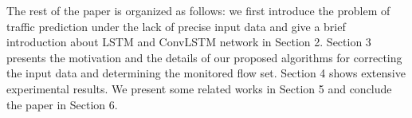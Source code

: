 The rest of the paper is organized as follows: we first introduce the problem of traffic prediction under the lack of precise input data and give a brief introduction about LSTM and ConvLSTM network in Section 2. Section 3 presents the motivation and the details of our proposed algorithms for correcting the input data and determining the monitored flow set. Section 4 shows extensive experimental results. We present some related works in Section 5 and conclude the paper in Section 6.
%


